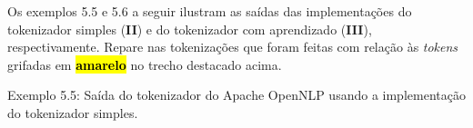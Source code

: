 \documentclass[11pt]{report}
\begin{document}
Os exemplos 5.5 e 5.6 a seguir ilustram as saídas das implementações do tokenizador simples (\textbf{II}) e do tokenizador com aprendizado (\textbf{III}), respectivamente. Repare nas tokenizações que foram feitas com relação às \textit{tokens} grifadas em \hl{\textbf{amarelo}} no trecho destacado acima.

\begin{quote}
                 \fbox{-}
 \fbox{-}   \fbox{-}       \fbox{/}  \fbox{/}  
             \fbox{,}
             
     \fbox{,}        
          \fbox{,}   
            
\end{quote}
\begin{center}
  Exemplo 5.5: Saída do tokenizador do Apache OpenNLP usando a implementação do tokenizador simples.
\end{center}
\end{document}
